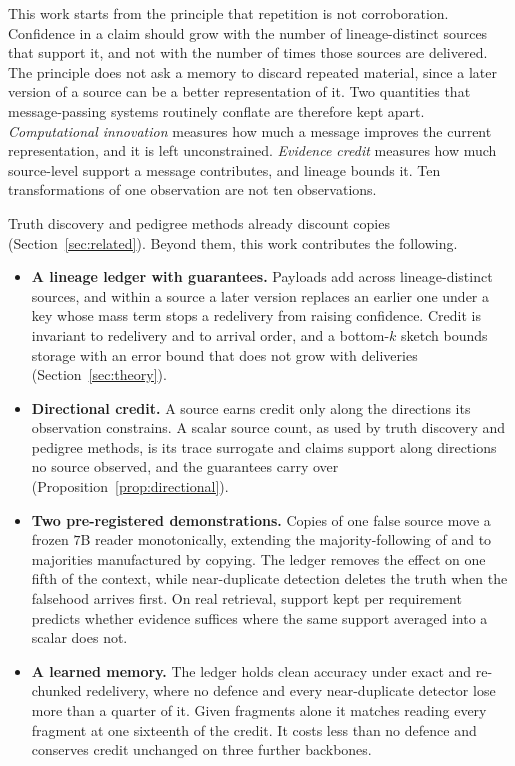 \documentclass{article}
\begin{document}
This work starts from the principle that repetition is not corroboration.
Confidence in a claim should grow with the number of lineage-distinct sources
that support it, and not with the number of times those sources are delivered.
The principle does not ask a memory to discard repeated material, since a later
version of a source can be a better representation of it. Two quantities that
message-passing systems routinely conflate are therefore kept apart.
\emph{Computational innovation} measures how much a message improves the current
representation, and it is left unconstrained. \emph{Evidence credit} measures
how much source-level support a message contributes, and lineage bounds it. Ten
transformations of one observation are not ten observations.

Truth discovery and pedigree methods already discount copies
(Section~\ref{sec:related}). Beyond them, this work contributes the following.
\begin{itemize}\setlength{\itemsep}{1pt}\setlength{\topsep}{2pt}
\item \textbf{A lineage ledger with guarantees.} Payloads add across
lineage-distinct sources, and within a source a later version replaces an
earlier one under a key whose mass term stops a redelivery from raising
confidence. Credit is invariant to redelivery and to arrival order, and a
bottom-$k$ sketch bounds storage with an error bound that does not grow with
deliveries (Section~\ref{sec:theory}).
\item \textbf{Directional credit.} A source earns credit only along the
directions its observation constrains. A scalar source count, as used by truth
discovery and pedigree methods, is its trace surrogate and claims support along
directions no source observed, and the guarantees carry over
(Proposition~\ref{prop:directional}).
\item \textbf{Two pre-registered demonstrations.} Copies of one false source
move a frozen $7$B reader monotonically, extending the majority-following of
\citet{xie2024chameleon} and \citet{naphade2026rational} to majorities
manufactured by copying. The ledger removes the effect on one fifth of the
context, while near-duplicate detection deletes the truth when the falsehood
arrives first. On real retrieval, support kept per requirement predicts whether
evidence suffices where the same support averaged into a scalar does not.
\item \textbf{A learned memory.} The ledger holds clean accuracy under exact and
re-chunked redelivery, where no defence and every near-duplicate detector lose
more than a quarter of it. Given fragments alone it matches reading every
fragment at one sixteenth of the credit. It costs less than no defence and
conserves credit unchanged on three further backbones.
\end{itemize}
\end{document}
